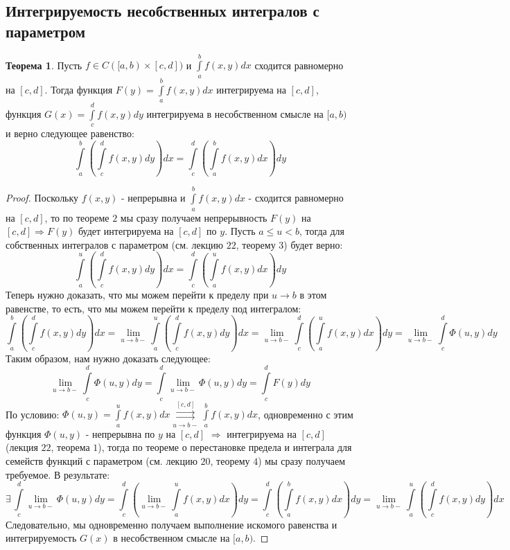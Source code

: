 \documentclass[12pt]{article}
\theoremstyle{definition}
\newtheorem{theorem}{Теорема}
\newcommand{\ddint}[2]{\displaystyle\int\limits_{#1}^{#2}}
\newcommand{\uconvm}[2]{\overset{#1}{\underset{#2}{\rightrightarrows}}}
\begin{document}
\subsection*{Интегрируемость несобственных интегралов с параметром}
\begin{theorem}
	Пусть $f \in C([a,b)\times[c,d])$ и $\ddint{a}{b}f(x,y)dx$ сходится равномерно на $[c,d]$.  Тогда функция $F(y) = \ddint{a}{b}f(x,y)dx$ интегрируема на $[c,d]$, функция $G(x) = \ddint{c}{d}f(x,y)dy$ интегрируема в несобственном смысле на $[a,b)$ и верно следующее равенство:
	$$
		\ddint{a}{b}\left(\ddint{c}{d}f(x,y)dy\right)dx = \ddint{c}{d}\left(\ddint{a}{b}f(x,y)dx\right)dy
	$$
\end{theorem}
\begin{proof}
	Поскольку $f(x,y)$ - непрерывна и $\ddint{a}{b}f(x,y)dx$ - сходится равномерно на $[c,d]$, то по теореме $2$ мы сразу получаем непрерывность $F(y)$ на $[c,d] \Rightarrow F(y)$ будет интегрируема на $[c,d]$ по $y$. Пусть $a \leq u < b$, тогда для собственных интегралов с параметром (см. лекцию $22$, теорему $3$) будет верно:
	$$
		\ddint{a}{u}\left(\ddint{c}{d}f(x,y)dy\right)dx = \ddint{c}{d}\left(\ddint{a}{u}f(x,y)dx\right)dy
	$$
	Теперь нужно доказать, что мы можем перейти к пределу при $u \to b$ в этом равенстве, то есть, что мы можем перейти к пределу под интегралом:
	$$
		\ddint{a}{b}\left(\ddint{c}{d}f(x,y)dy\right)dx = \lim\limits_{u \to b-}\ddint{a}{u}\left(\ddint{c}{d}f(x,y)dy\right)dx = \lim\limits_{u \to b-}\ddint{c}{d}\left(\ddint{a}{u}f(x,y)dx\right)dy = \lim\limits_{u \to b-}\ddint{c}{d}\Phi(u,y)dy
	$$
	Таким образом, нам нужно доказать следующее:
	$$
		\lim\limits_{u \to b-}\ddint{c}{d}\Phi(u,y)dy = \ddint{c}{d}\lim\limits_{u \to b-}\Phi(u,y)dy = \ddint{c}{d}F(y)dy
	$$
	По условию: $\Phi(u,y) = \ddint{a}{u}f(x,y)dx \uconvm{[c,d]}{u \to b-} \ddint{a}{b}f(x,y)dx$, одновременно с этим функция $\Phi(u,y)$ - непрерывна по $y$ на $[c,d]$ $\Rightarrow$ интегрируема на $[c,d]$ (лекция $22$, теорема $1$), тогда по теореме о перестановке предела и интеграла для семейств функций с параметром (см. лекцию $20$, теорему $4$) мы сразу получаем требуемое. В результате:
	$$
		\exists \, \ddint{c}{d}\lim\limits_{u \to b-}\Phi(u,y)dy = \ddint{c}{d}\left(\lim\limits_{u\to b-}\ddint{a}{u}f(x,y)dx\right)dy = \ddint{c}{d}\left(\ddint{a}{b}f(x,y)dx\right)dy = \lim\limits_{u \to b-}\ddint{a}{u}\left(\ddint{c}{d}f(x,y)dy\right)dx
	$$
	Следовательно, мы одновременно получаем выполнение искомого равенства и интегрируемость $G(x)$ в несобственном смысле на $[a,b)$.
\end{proof}
\end{document}
